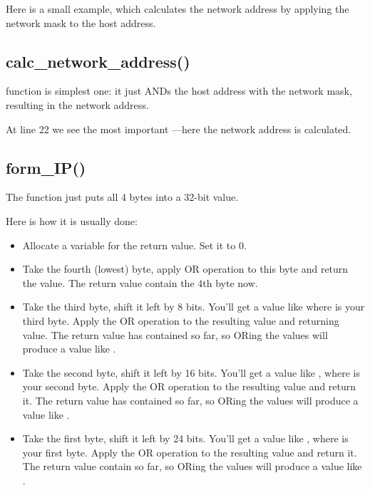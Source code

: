 Here is a small example, which calculates the network address by applying the network mask to the host address.



\subsection{calc\_network\_address()}

 function is simplest one: 
it just ANDs the host address with the network mask, resulting in the network address.



At line 22 we see the most important \AND---here the network address is calculated.

\subsection{form\_IP()}

The  function just puts all 4 bytes into a 32-bit value.

Here is how it is usually done:

\begin{itemize}
\item Allocate a variable for the return value.  Set it to 0.

\item Take the fourth (lowest) byte, apply OR operation to this byte and return the value.
The return value contain the 4th byte now.

\item Take the third byte, shift it left by 8 bits.
You'll get a value like  where  is your third byte.
Apply the OR operation to the resulting value and returning value.
The return value has contained  so far, so ORing the values will produce a value 
like .

\item Take the second byte, shift it left by 16 bits.
You'll get a value like , where  is your second byte.
Apply the OR operation to the resulting value and return it.
The return value has contained  so far, so ORing the values will produce
a value like .

\item Take the first byte, shift it left by 24 bits.
You'll get a value like , where  is your first byte.
Apply the OR operation to the resulting value and return it.
The return value contain  so far, so ORing the values will produce
a value like .

\end{itemize}

